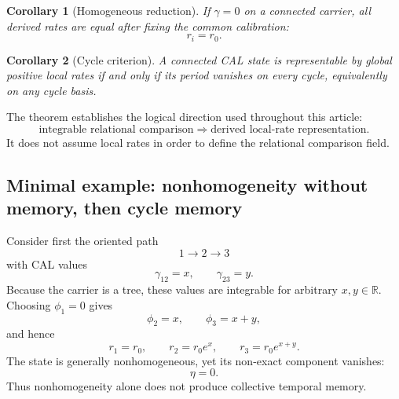 \documentclass[aip,jmp,amsmath,amssymb,reprint]{revtex4-2}
\newtheorem{corollary}{Corollary}
\begin{document}
\begin{corollary}[Homogeneous reduction]\label{cor:homogeneous-reduction}
If $\gamma=0$ on a connected carrier, all derived rates are equal after fixing the common calibration:
\begin{equation}
r_i=r_0.
\end{equation}
\end{corollary}

\begin{corollary}[Cycle criterion]\label{cor:cycle-criterion}
A connected CAL state is representable by global positive local rates if and only if its period vanishes on every cycle, equivalently on any cycle basis.
\end{corollary}

The theorem establishes the logical direction used throughout this article:
\begin{equation}
\text{integrable relational comparison}\Longrightarrow\text{derived local-rate representation}.
\label{eq:logic-direction}
\end{equation}
It does not assume local rates in order to define the relational comparison field.

\subsection{Minimal example: nonhomogeneity without memory, then cycle memory}\label{subsec:minimal-example}

Consider first the oriented path
\begin{equation}
1\longrightarrow2\longrightarrow3
\end{equation}
with CAL values
\begin{equation}
\gamma_{12}=x,\qquad\gamma_{23}=y.
\end{equation}
Because the carrier is a tree, these values are integrable for arbitrary $x,y\in\mathbb R$. Choosing $\phi_1=0$ gives
\begin{equation}
\phi_2=x,\qquad\phi_3=x+y,
\end{equation}
and hence
\begin{equation}
r_1=r_0,\qquad r_2=r_0e^x,\qquad r_3=r_0e^{x+y}.
\label{eq:path-rates}
\end{equation}
The state is generally nonhomogeneous, yet its non-exact component vanishes:
\begin{equation}
\eta=0.
\end{equation}
Thus nonhomogeneity alone does not produce collective temporal memory.
\end{document}
